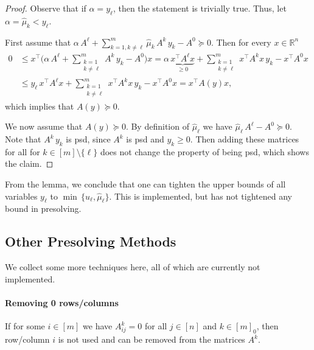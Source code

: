 \documentclass[10pt, a4paper]{article}
\newcommand{\T}{^{\top}}
\newcommand{\R}{\mathds{R}}
\begin{document}
\begin{proof}
  Observe that if $\alpha = y_{\ell}$, then the statement is trivially
  true. Thus, let $\alpha = \hat{\mu}_k < y_{\ell}$.

  First assume that
  $\alpha\, A^{\ell} + \sum_{k=1,k \neq \ell}^m \hat{\mu}_k\, A^k\, y_k - A^0
  \succeq 0$.  Then for every $x \in \R^n$
  \begin{align*}
    0 & \leq x\T \bigg(\alpha\, A^{\ell} + \sum_{\substack{k=1\\k \neq \ell}}^m A^k\, y_k - A^0\bigg) x =
        \alpha\, \underbrace{x\T A^{\ell} x}_{\geq 0} + \sum_{\substack{k=1\\k \neq \ell}}^m x\T A^k
        x\, y_k - x\T A^0 x\\
      & \leq y_{\ell}\, x\T A^{\ell} x + \sum_{\substack{k=1\\k \neq \ell}}^m x\T A^k x\, y_k - x\T A^0 x
        = x\T A(y)x,
  \end{align*}
  which implies that $A(y) \succeq 0$.

  We now assume that $A(y) \succeq 0$. By definition of $\hat{\mu}_{\ell}$
  we have $\hat{\mu}_{\ell}\, A^{\ell} - A^0 \succeq 0$. Note that
  $A^k \, y_k$ is psd, since $A^k$ is psd and $y_k \geq 0$. Then adding
  these matrices for all for $k \in [m] \setminus \{\ell\}$ does not change
  the property of being psd, which shows the claim.
\end{proof}

From the lemma, we conclude that one can tighten the upper bounds of all
variables $y_{\ell}$ to $\min\, \{u_{\ell}, \hat{\mu}_{\ell}\}$. This is
implemented, but has not tightened any bound in presolving.



\subsection{Other Presolving Methods}

We collect some more techniques here, all of which are currently not implemented.

\paragraph{Removing 0 rows/columns}

If for some $i \in [m]$ we have $A_{ij}^k = 0$ for all $j \in [n]$ and
$k \in [m]_0$, then row/column $i$ is not used and can be removed from the
matrices $A^k$.
\end{document}

